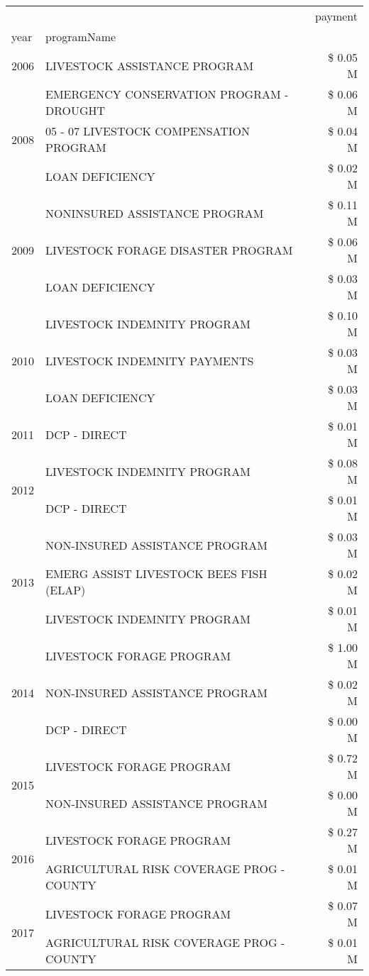 \begin{tabular}{llr}
\toprule
 &  & payment \\
year & programName &  \\
\midrule
2006 & LIVESTOCK ASSISTANCE PROGRAM & \$ 0.05 M \\
\cline{1-3}
\multirow[t]{3}{*}{2008} & EMERGENCY CONSERVATION PROGRAM - DROUGHT & \$ 0.06 M \\
 & 05 - 07 LIVESTOCK COMPENSATION PROGRAM & \$ 0.04 M \\
 & LOAN DEFICIENCY & \$ 0.02 M \\
\cline{1-3}
\multirow[t]{3}{*}{2009} & NONINSURED ASSISTANCE PROGRAM & \$ 0.11 M \\
 & LIVESTOCK FORAGE DISASTER  PROGRAM & \$ 0.06 M \\
 & LOAN DEFICIENCY & \$ 0.03 M \\
\cline{1-3}
\multirow[t]{3}{*}{2010} & LIVESTOCK INDEMNITY PROGRAM & \$ 0.10 M \\
 & LIVESTOCK INDEMNITY PAYMENTS & \$ 0.03 M \\
 & LOAN DEFICIENCY & \$ 0.03 M \\
\cline{1-3}
2011 & DCP - DIRECT & \$ 0.01 M \\
\cline{1-3}
\multirow[t]{2}{*}{2012} & LIVESTOCK INDEMNITY PROGRAM & \$ 0.08 M \\
 & DCP - DIRECT & \$ 0.01 M \\
\cline{1-3}
\multirow[t]{3}{*}{2013} & NON-INSURED ASSISTANCE PROGRAM & \$ 0.03 M \\
 & EMERG ASSIST LIVESTOCK BEES FISH (ELAP) & \$ 0.02 M \\
 & LIVESTOCK INDEMNITY PROGRAM & \$ 0.01 M \\
\cline{1-3}
\multirow[t]{3}{*}{2014} & LIVESTOCK FORAGE PROGRAM & \$ 1.00 M \\
 & NON-INSURED ASSISTANCE PROGRAM & \$ 0.02 M \\
 & DCP - DIRECT & \$ 0.00 M \\
\cline{1-3}
\multirow[t]{2}{*}{2015} & LIVESTOCK FORAGE PROGRAM & \$ 0.72 M \\
 & NON-INSURED ASSISTANCE PROGRAM & \$ 0.00 M \\
\cline{1-3}
\multirow[t]{2}{*}{2016} & LIVESTOCK FORAGE PROGRAM & \$ 0.27 M \\
 & AGRICULTURAL RISK COVERAGE PROG - COUNTY & \$ 0.01 M \\
\cline{1-3}
\multirow[t]{3}{*}{2017} & LIVESTOCK FORAGE PROGRAM & \$ 0.07 M \\
 & AGRICULTURAL RISK COVERAGE PROG - COUNTY & \$ 0.01 M \\

\end{tabular}

